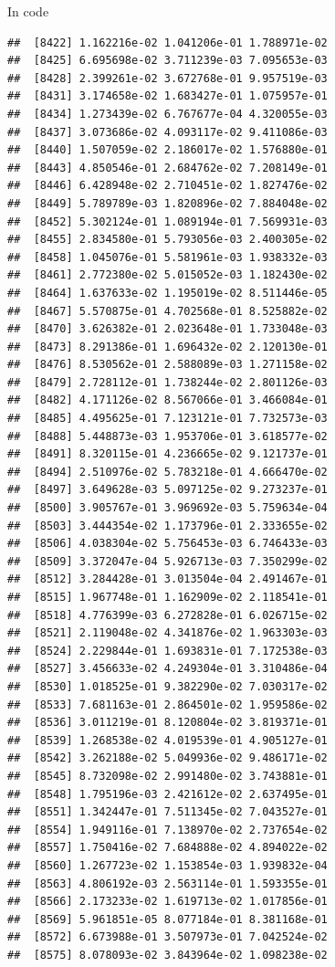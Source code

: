 \documentclass[ignorenonframetext,]{beamer}
\begin{document}
\begin{frame}[fragile]{In code}
\begin{verbatim}
##  [8422] 1.162216e-02 1.041206e-01 1.788971e-02
##  [8425] 6.695698e-02 3.711239e-03 7.095653e-03
##  [8428] 2.399261e-02 3.672768e-01 9.957519e-03
##  [8431] 3.174658e-02 1.683427e-01 1.075957e-01
##  [8434] 1.273439e-02 6.767677e-04 4.320055e-03
##  [8437] 3.073686e-02 4.093117e-02 9.411086e-03
##  [8440] 1.507059e-02 2.186017e-02 1.576880e-01
##  [8443] 4.850546e-01 2.684762e-02 7.208149e-01
##  [8446] 6.428948e-02 2.710451e-02 1.827476e-02
##  [8449] 5.789789e-03 1.820896e-02 7.884048e-02
##  [8452] 5.302124e-01 1.089194e-01 7.569931e-03
##  [8455] 2.834580e-01 5.793056e-03 2.400305e-02
##  [8458] 1.045076e-01 5.581961e-03 1.938332e-03
##  [8461] 2.772380e-02 5.015052e-03 1.182430e-02
##  [8464] 1.637633e-02 1.195019e-02 8.511446e-05
##  [8467] 5.570875e-01 4.702568e-01 8.525882e-02
##  [8470] 3.626382e-01 2.023648e-01 1.733048e-03
##  [8473] 8.291386e-01 1.696432e-02 2.120130e-01
##  [8476] 8.530562e-01 2.588089e-03 1.271158e-02
##  [8479] 2.728112e-01 1.738244e-02 2.801126e-03
##  [8482] 4.171126e-02 8.567066e-01 3.466084e-01
##  [8485] 4.495625e-01 7.123121e-01 7.732573e-03
##  [8488] 5.448873e-03 1.953706e-01 3.618577e-02
##  [8491] 8.320115e-01 4.236665e-02 9.121737e-01
##  [8494] 2.510976e-02 5.783218e-01 4.666470e-02
##  [8497] 3.649628e-03 5.097125e-02 9.273237e-01
##  [8500] 3.905767e-01 3.969692e-03 5.759634e-04
##  [8503] 3.444354e-02 1.173796e-01 2.333655e-02
##  [8506] 4.038304e-02 5.756453e-03 6.746433e-03
##  [8509] 3.372047e-04 5.926713e-03 7.350299e-02
##  [8512] 3.284428e-01 3.013504e-04 2.491467e-01
##  [8515] 1.967748e-01 1.162909e-02 2.118541e-01
##  [8518] 4.776399e-03 6.272828e-01 6.026715e-02
##  [8521] 2.119048e-02 4.341876e-02 1.963303e-03
##  [8524] 2.229844e-01 1.693831e-01 7.172538e-03
##  [8527] 3.456633e-02 4.249304e-01 3.310486e-04
##  [8530] 1.018525e-01 9.382290e-02 7.030317e-02
##  [8533] 7.681163e-01 2.864501e-02 1.959586e-02
##  [8536] 3.011219e-01 8.120804e-02 3.819371e-01
##  [8539] 1.268538e-02 4.019539e-01 4.905127e-01
##  [8542] 3.262188e-02 5.049936e-02 9.486171e-02
##  [8545] 8.732098e-02 2.991480e-02 3.743881e-01
##  [8548] 1.795196e-03 2.421612e-02 2.637495e-01
##  [8551] 1.342447e-01 7.511345e-02 7.043527e-01
##  [8554] 1.949116e-01 7.138970e-02 2.737654e-02
##  [8557] 1.750416e-02 7.684888e-02 4.894022e-02
##  [8560] 1.267723e-02 1.153854e-03 1.939832e-04
##  [8563] 4.806192e-03 2.563114e-01 1.593355e-01
##  [8566] 2.173233e-02 1.619713e-02 1.017856e-01
##  [8569] 5.961851e-05 8.077184e-01 8.381168e-01
##  [8572] 6.673988e-01 3.507973e-01 7.042524e-02
##  [8575] 8.078093e-02 3.843964e-02 1.098238e-02

\end{verbatim}
\end{frame}
\end{document}
